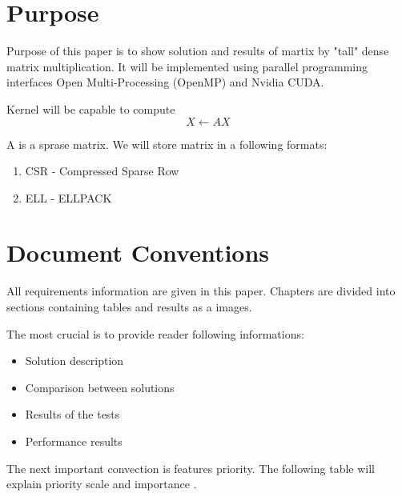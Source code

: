 \documentclass{scrreprt}
\begin{document}
\section{Purpose}
Purpose of this paper is to show solution and results of martix by "tall" dense matrix multiplication. It will be implemented using parallel programming interfaces Open Multi-Processing (OpenMP) and Nvidia CUDA.  

Kernel will be capable to compute
\begin{equation} \label{eu_eqn}
X \leftarrow AX
\end{equation}

A is a sprase matrix. We will store matrix in a following formats:
\begin{enumerate}
\item CSR - Compressed Sparse Row
\item ELL - ELLPACK

\end{enumerate}




\section{Document Conventions}
All requirements information are given in this paper. Chapters are divided into sections containing tables and results as a images.

The most crucial is to provide reader following informations:
\begin{itemize}
	\item Solution description
	\item Comparison between solutions
	\item Results of the tests
	\item Performance results
\end{itemize}  


The next important convection is features priority. The following table will explain priority scale and importance .
\end{document}
